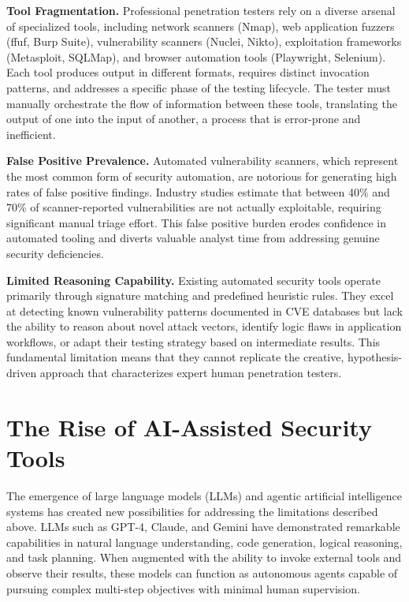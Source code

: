 \textbf{Tool Fragmentation.} Professional penetration testers rely on a diverse arsenal of specialized tools, including network scanners (Nmap), web application fuzzers (ffuf, Burp Suite), vulnerability scanners (Nuclei, Nikto), exploitation frameworks (Metasploit, SQLMap), and browser automation tools (Playwright, Selenium). Each tool produces output in different formats, requires distinct invocation patterns, and addresses a specific phase of the testing lifecycle. The tester must manually orchestrate the flow of information between these tools, translating the output of one into the input of another, a process that is error-prone and inefficient.

\textbf{False Positive Prevalence.} Automated vulnerability scanners, which represent the most common form of security automation, are notorious for generating high rates of false positive findings. Industry studies estimate that between 40\% and 70\% of scanner-reported vulnerabilities are not actually exploitable, requiring significant manual triage effort. This false positive burden erodes confidence in automated tooling and diverts valuable analyst time from addressing genuine security deficiencies.

\textbf{Limited Reasoning Capability.} Existing automated security tools operate primarily through signature matching and predefined heuristic rules. They excel at detecting known vulnerability patterns documented in CVE databases but lack the ability to reason about novel attack vectors, identify logic flaws in application workflows, or adapt their testing strategy based on intermediate results. This fundamental limitation means that they cannot replicate the creative, hypothesis-driven approach that characterizes expert human penetration testers.

\section{The Rise of AI-Assisted Security Tools}
\label{sec:ai-rise}

The emergence of large language models (LLMs) and agentic artificial intelligence systems has created new possibilities for addressing the limitations described above. LLMs such as GPT-4, Claude, and Gemini have demonstrated remarkable capabilities in natural language understanding, code generation, logical reasoning, and task planning. When augmented with the ability to invoke external tools and observe their results, these models can function as autonomous agents capable of pursuing complex multi-step objectives with minimal human supervision.

